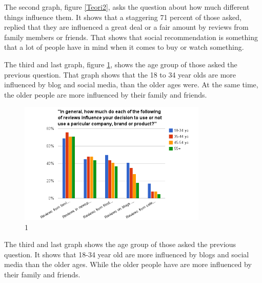 The second graph, figure \ref{Teori2}, asks the question about how much different things influence them. It shows that a staggering 71 percent of those asked, replied that they are influenced a great deal or a fair amount by reviews from family members or friends. That shows that social recommendation is something that a lot of people have in mind when it comes to buy or watch something.

The third and last graph, figure \ref{Teori3}, shows the age group of those asked the previous question. That graph shows that the 18 to 34 year olds are more influenced by blog and social media, than the older ages were. At the same time, the older people are more influenced by their family and friends.

\begin{figure}[htb]
\centering
\includegraphics[width=0.8\textwidth]{Images/teori3.png}
\caption{1}
\label{Teori3}
\end{figure}

The third and last graph shows the age group of those asked the previous question. It shows that 18-34 year old are more influenced by blogs and social media than the older ages. While the older people have are more influenced by their family and friends.